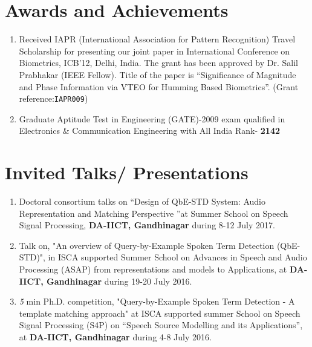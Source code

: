 \documentclass[10pt]{article}
\begin{document}
\section*{Awards and Achievements}
\begin{enumerate}
				\setlength\itemsep{0.15em}
\item Received IAPR (International Association for Pattern Recognition) Travel Scholarship for presenting our joint paper in International Conference on Biometrics, ICB'12, Delhi, India. The grant has been approved by Dr. Salil Prabhakar (IEEE Fellow).  Title of the paper is ``Significance of Magnitude and Phase Information via VTEO for Humming Based Biometrics''. (Grant reference:\verb|IAPR009|)
\item Graduate Aptitude Test in Engineering (GATE)-2009 exam qualified in Electronics \& Communication Engineering with All India Rank- \textbf{2142} 
\end{enumerate}

\section*{Invited Talks/ Presentations}
\begin{enumerate}
			\setlength\itemsep{0.15em}
\item Doctoral consortium talks on ``Design of QbE-STD System: Audio Representation and Matching Perspective ''at Summer School on Speech Signal Processing, \textbf{DA-IICT, Gandhinagar} during 8-12 July 2017.
\item Talk on, "An overview of Query-by-Example Spoken Term Detection (QbE-STD)", in ISCA supported Summer School on Advances in Speech and Audio Processing (ASAP) from representations and models to Applications, at \textbf{DA-IICT, Gandhinagar} during 19-20 July 2016.
\item \textit{5} min Ph.D. competition, "Query-by-Example Spoken Term Detection - A template matching approach" at ISCA supported summer School on Speech Signal Processing (S4P) on ``Speech Source Modelling and its Applications'', at \textbf{DA-IICT, Gandhinagar} during 4-8 July 2016.   
\end{enumerate}
\end{document}
